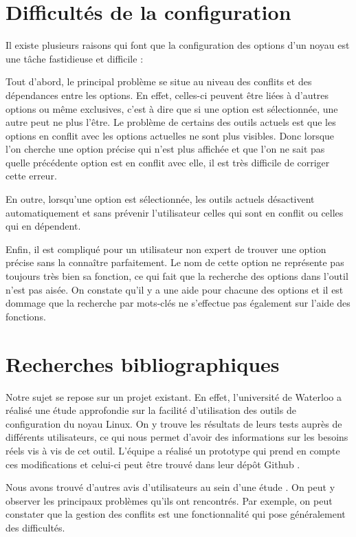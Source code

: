 \documentclass[16pts]{report}
\begin{document}
\chapter{Difficultés de la configuration}

Il existe plusieurs raisons qui font que la configuration des options d’un noyau
    est une tâche fastidieuse et difficile :

Tout d’abord, le principal problème se situe au niveau des conflits et
    des dépendances entre les options. En effet, celles-ci peuvent
    être liées à d’autres options ou même exclusives, c’est à dire que si
    une option est sélectionnée, une autre peut ne plus l’être.
    Le problème de certains des outils actuels est que les options en conflit
    avec les options actuelles ne sont plus visibles. Donc lorsque l’on cherche
    une option précise qui n’est plus affichée et que l’on ne sait pas quelle
    précédente option est en conflit avec elle, il est très difficile de
    corriger cette erreur.

En outre, lorsqu'une option est sélectionnée, les outils actuels désactivent
    automatiquement et sans prévenir l'utilisateur celles qui sont en conflit
    ou celles qui en dépendent.

Enfin, il est compliqué pour un utilisateur non expert de trouver une
    option précise sans la connaître parfaitement. Le nom de cette option
    ne représente pas toujours très bien sa fonction, ce qui fait que
    la recherche des options dans l’outil n’est pas aisée.
    On constate qu’il y a une aide pour chacune des options et
    il est dommage que la recherche par mots-clés ne s’effectue pas également
    sur l’aide des fonctions.

\chapter{Recherches bibliographiques}

Notre sujet se repose sur un projet existant. En effet, l'université de Waterloo
a réalisé une étude approfondie \cite{Waterloo:Etude} sur la facilité
d'utilisation des outils de configuration du noyau Linux. On y trouve les
résultats de leurs tests auprès de différents utilisateurs, ce qui nous permet
d'avoir des informations sur les besoins réels vis à vis de cet outil. L'équipe
a réalisé un prototype qui prend en compte ces modifications et celui-ci peut
être trouvé dans leur dépôt Github \cite{Waterloo:Github}.

Nous avons trouvé d'autres avis d'utilisateurs au sein d'une étude
\cite{Hubaux:2012:USC:2110147.2110164}. On peut y observer les principaux
problèmes qu'ils ont rencontrés. Par exemple, on peut constater que la gestion
des conflits est une fonctionnalité qui pose généralement des difficultés.
\end{document}
